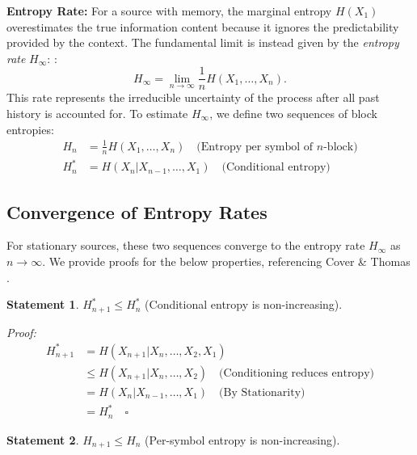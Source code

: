 \documentclass[11pt,a4paper]{article}
\theoremstyle{definition} %
\newtheorem{statement}{Statement}
\newcommand{\Hrate}{H_\infty}
\begin{document}
\textbf{Entropy Rate:}
For a source with memory, the marginal entropy $H(X_1)$ overestimates the true information content because it ignores the predictability provided by the context. The fundamental limit is instead given by the \textit{entropy rate} $\Hrate$: \cite[Def 4.1]{cover}:
\begin{equation}
    \Hrate = \lim_{n \to \infty} \frac{1}{n} H(X_1, \dots, X_n).
\end{equation}
This rate represents the irreducible uncertainty of the process after all past history is accounted for. To estimate $\Hrate$, we define two sequences of block entropies:
\begin{align}
    H_n   & = \frac{1}{n} H(X_1, \dots, X_n) \quad \text{(Entropy per symbol of $n$-block)} \\
    H_n^* & = H(X_n | X_{n-1}, \dots, X_1) \quad \text{(Conditional entropy)}
\end{align}

\subsection{Convergence of Entropy Rates}

For stationary sources, these two sequences converge to the entropy rate $\Hrate$ as $n \to \infty$. We provide proofs for the below properties, referencing Cover \& Thomas \cite[Chap 4]{cover}.

\begin{statement} \label{stm:cond_non_increasing}
    $H_{n+1}^* \le H_n^*$ (Conditional entropy is non-increasing).
\end{statement}

\textit{Proof:}
\begin{align*}
    H_{n+1}^* & = H(X_{n+1} | X_n, \dots, X_2, X_1)                                          \\
              & \le H(X_{n+1} | X_n, \dots, X_2) \quad \text{(Conditioning reduces entropy)} \\
              & = H(X_n | X_{n-1}, \dots, X_1) \quad \text{(By Stationarity)}                \\
              & = H_n^* \quad \square
\end{align*}

\begin{statement} \label{stm:persymbol_non_increasing}
    $H_{n+1} \le H_n$ (Per-symbol entropy is non-increasing).
\end{statement}
\end{document}

